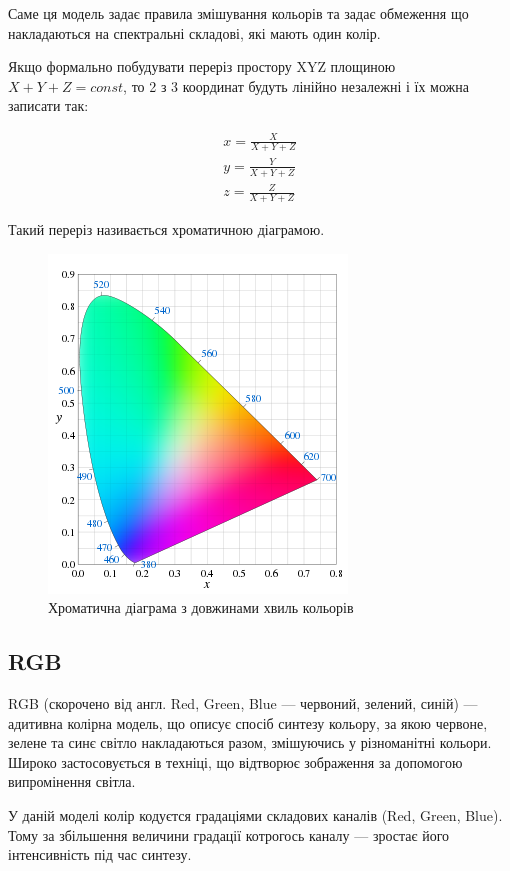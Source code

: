 Саме ця модель задає правила змішування кольорів та задає обмеження що накладаються на спектральні складові, які мають один колір.

Якщо формально побудувати переріз простору XYZ площиною $ X + Y + Z = const $, то 2 з 3 координат будуть лінійно незалежні і їх можна записати так:

\begin{equation}
	\begin{split}
		x = \frac{X}{X + Y + Z} \\
		y = \frac{Y}{X + Y + Z} \\
		z = \frac{Z}{X + Y + Z}
	\end{split}
	\label{eq:xyz_plate_cut}
\end{equation}

Такий переріз називається хроматичною діаграмою.

\begin{figure}[H]
	\centering
	\includegraphics[width=0.5\linewidth]{theory/img/chromatic_diagram}
	\caption{Хроматична діаграма з довжинами хвиль кольорів}
	\label{fig:chromatic_diagram}
\end{figure}

\subsection{RGB}
RGB (скорочено від англ. Red, Green, Blue — червоний, зелений, синій) — адитивна колірна модель, що описує спосіб синтезу кольору, за якою червоне, зелене та синє світло накладаються разом, змішуючись у різноманітні кольори. Широко застосовується в техніці, що відтворює зображення за допомогою випромінення світла.

У даній моделі колір кодуєтся градаціями складових каналів (Red, Green, Blue). Тому за збільшення величини градації котрогось каналу — зростає його інтенсивність під час синтезу.

